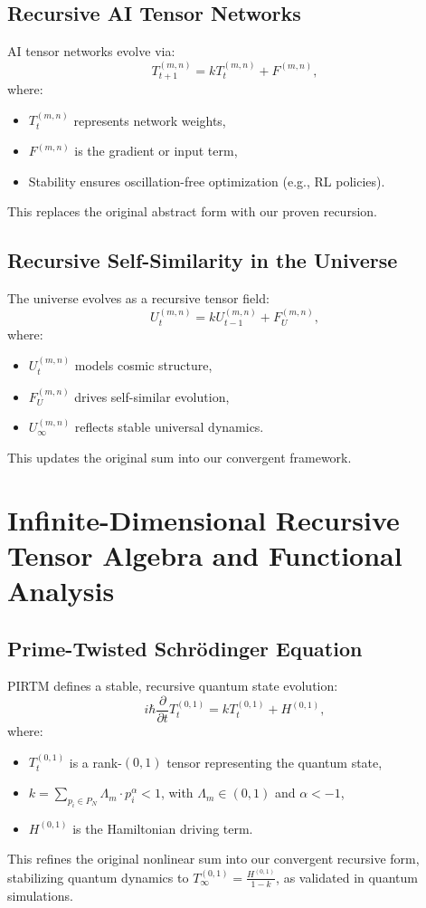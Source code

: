 \documentclass{article}
\theoremstyle{plain}
\begin{document}
\subsection{Recursive AI Tensor Networks}
AI tensor networks evolve via:
\begin{equation}
    T_{t+1}^{(m,n)} = k T_t^{(m,n)} + F^{(m,n)},
\end{equation}
where:
\begin{itemize}
    \item \( T_t^{(m,n)} \) represents network weights,
    \item \( F^{(m,n)} \) is the gradient or input term,
    \item Stability ensures oscillation-free optimization (e.g., RL policies).
\end{itemize}
This replaces the original abstract form with our proven recursion.

\subsection{Recursive Self-Similarity in the Universe}
The universe evolves as a recursive tensor field:
\begin{equation}
    U_t^{(m,n)} = k U_{t-1}^{(m,n)} + F_U^{(m,n)},
\end{equation}
where:
\begin{itemize}
    \item \( U_t^{(m,n)} \) models cosmic structure,
    \item \( F_U^{(m,n)} \) drives self-similar evolution,
    \item \( U_\infty^{(m,n)} \) reflects stable universal dynamics.
\end{itemize}
This updates the original sum into our convergent framework.

\section{Infinite-Dimensional Recursive Tensor Algebra and Functional Analysis}

\subsection{Prime-Twisted Schrödinger Equation}
PIRTM defines a stable, recursive quantum state evolution:
\begin{equation}
    i\hbar \frac{\partial}{\partial t} T_t^{(0,1)} = k T_t^{(0,1)} + H^{(0,1)},
\end{equation}
where:
\begin{itemize}
    \item \( T_t^{(0,1)} \) is a rank-$(0,1)$ tensor representing the quantum state,
    \item \( k = \sum_{p_i \in P_N} \Lambda_m \cdot p_i^\alpha < 1 \), with \( \Lambda_m \in (0, 1) \) and \( \alpha < -1 \),
    \item \( H^{(0,1)} \) is the Hamiltonian driving term.
\end{itemize}
This refines the original nonlinear sum into our convergent recursive form, stabilizing quantum dynamics to \( T_\infty^{(0,1)} = \frac{H^{(0,1)}}{1 - k} \), as validated in quantum simulations.
\end{document}
